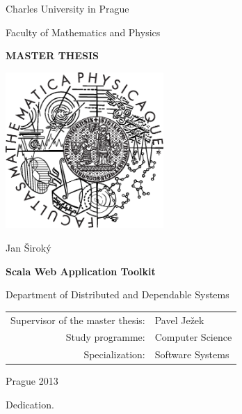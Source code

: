 \documentclass[12pt,a4paper]{report}
\begin{document}



\pagestyle{empty}

\begin{center}
\large Charles University in Prague
\medskip

Faculty of Mathematics and Physics

\vfill

{\bf\Large MASTER THESIS}

\vfill

\centerline{\mbox{\includegraphics[width=60mm]{img/logo.eps}}}

\vfill

\vspace{5mm}

{\LARGE Jan Široký}

\vspace{15mm}

{\LARGE\bfseries Scala Web Application Toolkit}

\vfill

Department of Distributed and Dependable Systems

\vfill

\begin{tabular}{rl}
Supervisor of the master thesis: & Pavel Ježek \\
\noalign{\vspace{2mm}}
Study programme: & Computer Science \\
\noalign{\vspace{2mm}}
Specialization: & Software Systems \\
\end{tabular}

\vfill

Prague 2013
\end{center}



\newpage
\noindent 
Dedication.
\end{document}
